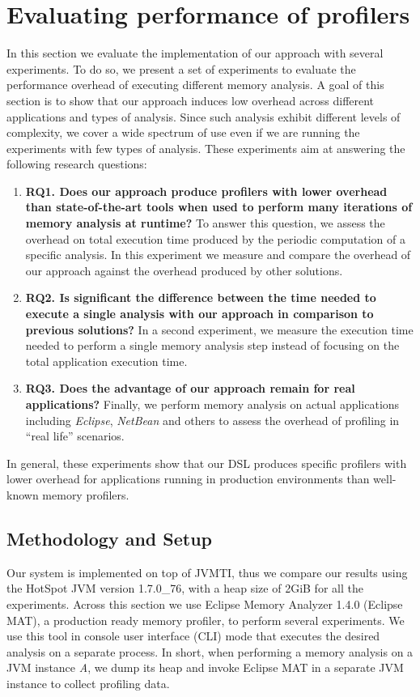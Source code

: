 \section{Evaluating performance of profilers}\label{sec:evaluation}

In this section we evaluate the implementation of our approach with several experiments.
To do so, we present a set of experiments to evaluate the performance overhead of executing different memory analysis.
A goal of this section is to show that our approach induces low overhead across different applications and types of analysis.
Since such analysis exhibit different levels of complexity, we cover a wide spectrum of use even if we are running the experiments with few types of analysis.
 These experiments aim at answering the following research questions:
\begin{enumerate}
\item \textbf{RQ1. Does our approach produce profilers with lower overhead than state-of-the-art tools when used to perform many iterations of memory analysis at runtime?} To answer this question, we assess the overhead on total execution time produced by the periodic computation of a specific analysis.
In this experiment we measure and compare the overhead of our approach against the overhead produced by other solutions.
\item \textbf{RQ2. Is significant the difference between the time needed to execute a single analysis with our approach in comparison to previous solutions? }
In a second experiment, we measure the execution time needed to perform a single memory analysis step instead of focusing on the total application execution time.
\item \textbf{RQ3. Does the advantage of our approach remain for real applications? }
 Finally, we perform memory analysis on actual applications including \textit{Eclipse}, \textit{NetBean} and others to assess the overhead of profiling in ``real life'' scenarios. 
\end{enumerate}

In general, these experiments show that our DSL produces specific profilers with lower overhead for applications running in production environments than well-known memory profilers.

\subsection{Methodology and Setup}\label{sec:MethodologyAndSetup}
Our system is implemented on top of JVMTI, thus we compare our results using the HotSpot JVM version 1.7.0\_76, with a heap size of 2GiB for all the experiments.
Across this section we use Eclipse Memory Analyzer 1.4.0 (Eclipse MAT),  a production ready memory profiler, to perform several experiments.
We use  this tool in console user interface (CLI) mode that executes the desired analysis on a separate process.
In short, when performing a memory analysis on a JVM instance \textit{A}, we dump its heap and invoke Eclipse MAT in a separate JVM instance to collect profiling data.

